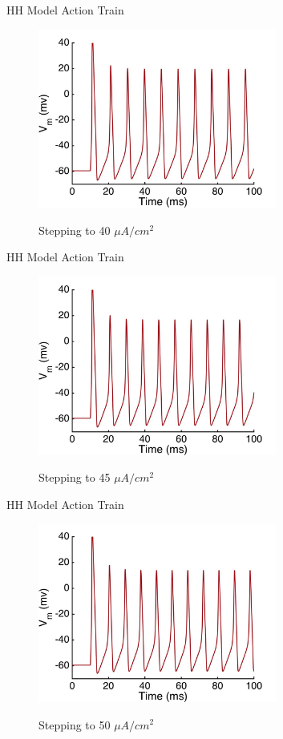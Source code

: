 \documentclass{beamer}
\begin{document}
\begin{frame}{HH Model Action Train}
  \begin{figure}
    \centering
    \includegraphics[width = 0.7\textwidth]{./images/current_0_40.jpg}

    Stepping to 40 $\mu A/cm^2$
  \end{figure}
\end{frame}


\begin{frame}{HH Model Action Train}
  \begin{figure}
    \centering
    \includegraphics[width = 0.7\textwidth]{./images/current_0_45.jpg}

    Stepping to 45 $\mu A/cm^2$
  \end{figure}
\end{frame}


\begin{frame}{HH Model Action Train}
  \begin{figure}
    \centering
    \includegraphics[width = 0.7\textwidth]{./images/current_0_50.jpg}

    Stepping to 50 $\mu A/cm^2$
  \end{figure}
\end{frame}
\end{document}
